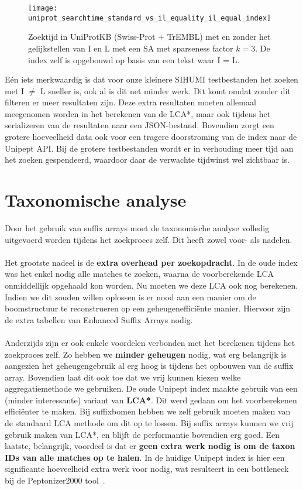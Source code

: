 \begin{figure}[ht]
    \centering
    \texttt{[image: uniprot\_searchtime\_standard\_vs\_il\_equality\_il\_equal\_index]}
    \caption{Zoektijd in UniProtKB (Swiss-Prot + TrEMBL) met en zonder het gelijkstellen van I en L met een SA met sparseness factor $k = 3$. De index zelf is opgebouwd op basis van een tekst waar I = L.}
    \label{fig:uniprot_search_il_equal}
\end{figure}

Eén iets merkwaardig is dat voor onze kleinere SIHUMI testbestanden het zoeken met I $\neq$ L sneller is, ook al is dit net minder werk.
Dit komt omdat zonder dit filteren er meer resultaten zijn.
Deze extra resultaten moeten allemaal meegenomen worden in het berekenen van de LCA*, maar ook tijdens het serializeren van de resultaten naar een JSON-bestand.
Bovendien zorgt een grotere hoeveelheid data ook voor een tragere doorstroming van de index naar de Unipept API\@.
Bij de grotere testbestanden wordt er in verhouding meer tijd aan het zoeken gespendeerd, waardoor daar de verwachte tijdwinst wel zichtbaar is.

\section{Taxonomische analyse}\label{sec:taxonomische-analyse}
Door het gebruik van suffix arrays moet de taxonomische analyse volledig uitgevoerd worden tijdens het zoekproces zelf.
Dit heeft zowel voor- als nadelen.
\\ \\
Het grootste nadeel is de \textbf{extra overhead per zoekopdracht}.
In de oude index was het enkel nodig alle matches te zoeken, waarna de voorberekende LCA onmiddellijk opgehaald kon worden.
Nu moeten we deze LCA ook nog berekenen.
Indien we dit zouden willen oplossen is er nood aan een manier om de boomstructuur te reconstrueren op een geheugenefficiënte manier.
Hiervoor zijn de extra tabellen van Enhanced Suffix Arrays nodig.
\\ \\
Anderzijds zijn er ook enkele voordelen verbonden met het berekenen tijdens het zoekproces zelf.
Zo hebben we \textbf{minder geheugen} nodig, wat erg belangrijk is aangezien het geheugengebruik al erg hoog is tijdens het opbouwen van de suffix array.
Bovendien laat dit ook toe dat we vrij kunnen kiezen welke aggregatiemethode we gebruiken.
De oude Unipept index maakte gebruik van een (minder interessante) variant van \textbf{LCA*}.
Dit werd gedaan om het voorberekenen efficiënter te maken.
Bij suffixbomen hebben we zelf gebruik moeten maken van de standaard LCA methode om dit op te lossen.
Bij suffix arrays kunnen we vrij gebruik maken van LCA*, en blijft de performantie bovendien erg goed.
Een laatste, belangrijk, voordeel is dat er \textbf{geen extra werk nodig is om de taxon IDs van alle matches op te halen}.
In de huidige Unipept index is hier een significante hoeveelheid extra werk voor nodig, wat resulteert in een bottleneck bij de Peptonizer2000 tool~\cite{pep_gm}.


